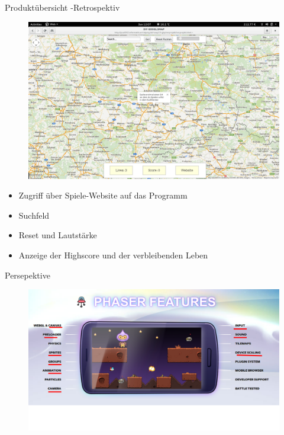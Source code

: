 \documentclass{beamer}
\begin{document}
\begin{frame}{Produktübersicht -Retrospektiv}
\begin{figure}[htb]
  \centering
  \includegraphics[scale=0.18]{1.png}
  \label{PNFs}
\end{figure} 
\begin{itemize}
\item Zugriff über Spiele-Website auf das Programm
\item Suchfeld
\item  Reset und Lautstärke
\item Anzeige der Highscore und der verbleibenden Leben  
\end{itemize}
\end{frame}
\begin{frame}{Persepektive}
\begin{figure}[htb]
  \centering
  \includegraphics[scale=0.48]{3.png}
  \label{PNFs}
\end{figure} 
\end{frame}
\end{document}
